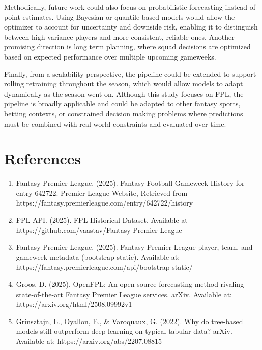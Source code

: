 \documentclass[11pt,a4paper]{article}
\begin{document}
Methodically, future work could also focus on probabilistic forecasting instead of point estimates. Using Bayesian or quantile-based models would allow the optimizer to account for uncertainty and downside risk, enabling it to distinguish between high variance players and more consistent, reliable ones. Another promising direction is long term planning, where squad decisions are optimized based on expected performance over multiple upcoming gameweeks. 

Finally, from a scalability perspective, the pipeline could be extended to support rolling retraining throughout the season, which would allow models to adapt dynamically as the season went on. Although this study focuses on FPL, the pipeline is broadly applicable and could be adapted to other fantasy sports, betting contexts, or constrained decision making problems where predictions must be combined with real world constraints and evaluated over time. 


\newpage
\section*{References}


\begin{enumerate}
    \item Fantasy Premier League. (2025). Fantasy Football Gameweek History for entry 642722. Premier League Website, Retrieved from https://fantasy.premierleague.com/entry/642722/history
    \item FPL API. (2025). FPL Historical Dataset. Available at https://github.com/vaastav/Fantasy-Premier-League
    \item Fantasy Premier League. (2025). Fantasy Premier League player, team, and gameweek metadata (bootstrap-static). Available at: https://fantasy.premierleague.com/api/bootstrap-static/
    \item Groos, D. (2025). OpenFPL: An open-source forecasting method rivaling state-of-the-art Fantasy Premier League services. arXiv. Available at: https://arxiv.org/html/2508.09992v1
    \item Grinsztajn, L., Oyallon, E., & Varoquaux, G. (2022). Why do tree-based models still outperform deep learning on typical tabular data? arXiv. Available at: https://arxiv.org/abs/2207.08815
\end{enumerate}
\end{document}
